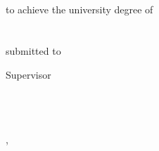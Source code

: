 
\begin{titlepage}


%

\centering
~
\vfill\vfill\vfill

\sffamily

\myauthorwithexistingtitles

\vfill

{\LARGE\bfseries\mytitle}

{\large\bfseries\mysubtitle}

\vfill\vfill\vfill\vfill

{\normalsize\bfseries\myworktitle}\\
\vfill
to achieve the university degree of\\
{\mygrade}\\
\vfill
{\mydegreeprogramme}\\
\vfill
submitted to\\
{\normalsize\bfseries\myuniversity}

\vfill\vfill\vfill
\vfill\vfill\vfill

Supervisor\\
\mysupervisor\\
\vfill
\myevaluator\\
\vfill
\vfill
\myinstitute\\

\vfill

\myfaculty

\vfill\vfill\vfill

{\scriptsize\mysubmissiontown, \mysubmissionmonth~\mysubmissionyear}

\end{titlepage}

